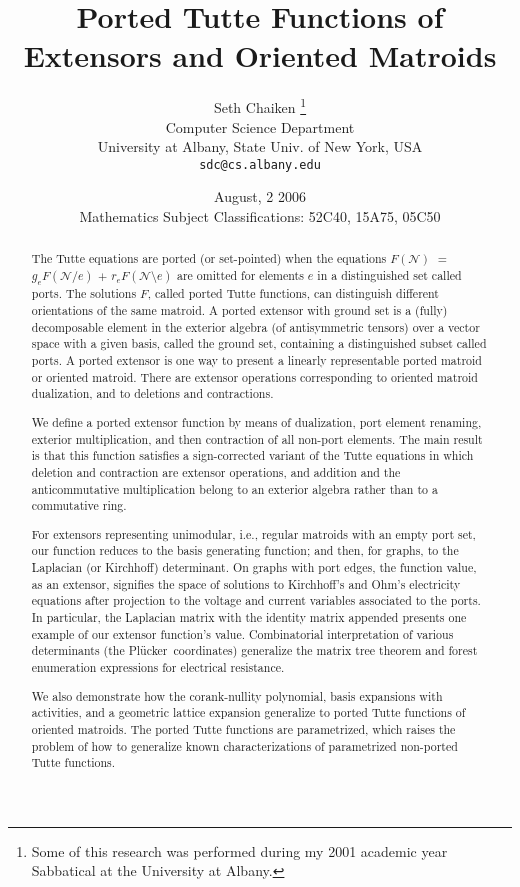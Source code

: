\documentclass[12pt]{article}
\title{Ported Tutte Functions of Extensors and Oriented Matroids}
\author{Seth Chaiken
\thanks{Some of this research was 
performed during my 2001 academic year 
Sabbatical at the University at Albany.}\\
\small Computer Science Department\\[-0.8ex]
\small University at Albany, State Univ. of New York, USA\\[-0.8ex]
\small \texttt{sdc@cs.albany.edu}
}
\date{August, 2 2006\\
\small Mathematics Subject Classifications: 52C40, 15A75, 05C50}
\theoremstyle{definition}
\newcommand{\Plucker}{Pl\"{u}cker\ }
\begin{document}
\maketitle

\newpage
\begin{abstract}
The Tutte equations are ported (or set-pointed) when the equations
$F(\mathcal{N})$ $=$ $g_eF(\mathcal{N}/e)$ $+$ 
$r_eF(\mathcal{N}\setminus e)$ are 
omitted for elements $e$ in a distinguished set
called ports.
The solutions $F$, called ported Tutte
functions, can distinguish different orientations of the same matroid. 
A ported extensor with ground set is a (fully) decomposable element
in the exterior algebra (of antisymmetric tensors) over a vector space with
a given basis, called the ground set, containing a distinguished subset 
called ports.  A ported extensor is one way to present a linearly 
representable ported matroid or oriented matroid.  There are extensor operations
corresponding to oriented matroid dualization, and to deletions and
contractions.

We define a ported extensor function by means of dualization, 
port element renaming, exterior multiplication, 
and then contraction of all non-port elements.  The main result is
that this function  satisfies 
a sign-corrected variant of the Tutte equations in which deletion
and contraction are extensor operations, and addition and 
the anticommutative multiplication belong to an exterior algebra
rather than to a commutative ring.

For extensors representing unimodular, i.e., regular
matroids with an empty port set, our function reduces to the basis
generating function; and then, for graphs, to the Laplacian (or
Kirchhoff) determinant.  On graphs with port edges, the function
value, as an extensor, signifies the space of solutions to Kirchhoff's
and Ohm's electricity equations after projection to the voltage and
current variables associated to the ports.  
In
particular, the Laplacian matrix with the identity matrix appended 
presents one example of our extensor function's value.  
Combinatorial interpretation
of various determinants (the \Plucker coordinates) generalize 
the matrix tree theorem and forest enumeration expressions for 
electrical resistance.  

We also demonstrate how the corank-nullity polynomial, basis expansions
with activities, and a geometric lattice expansion generalize to 
ported Tutte functions of oriented matroids.  The ported 
Tutte functions are parametrized, which raises 
the problem of how to generalize known characterizations
of parametrized non-ported Tutte functions.
\end{abstract}
\end{document}
